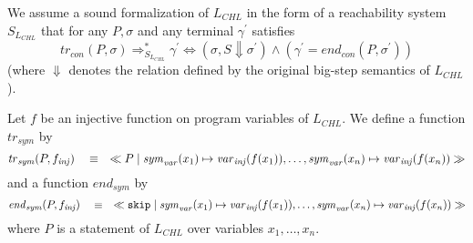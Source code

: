 \begin{assumption}\label{a:sf}
    We assume a sound formalization of $L_{\mathit{CHL}}$ in the form of a reachability system
    $S_{L_{\mathit{CHL}}}$ that for any $P,\sigma$ and any terminal $\gamma^\prime$ satisfies
    \begin{equation*}
        \mathit{tr}_{\mathit{con}}(P, \sigma) \Rightarrow^*_{S_{L_{\mathit{CHL}}}} \gamma^\prime
        \iff
        (\sigma, S \Downarrow \sigma^\prime) \land (\gamma^\prime = \mathit{end}_{\mathit{con}}(P, \sigma^\prime))
    \end{equation*}
    (where $\Downarrow$ denotes the relation defined by the original big-step semantics of $L_{\mathit{CHL}}$).
\end{assumption}

\begin{definition}
    Let $f$ be an injective function on program variables of $L_{\mathit{CHL}}$.
    We define a function $\mathit{tr}_{\mathit{sym}}$ by
    \begin{equation*}
        \mathit{tr}_{\mathit{sym}}(P, f_{\mathit{inj}}) \quad \equiv \quad
        \impConfig{P}{
            \mathit{sym}_\mathit{var}(x_1) \mapsto \mathit{var}_{\mathit{inj}}(f(x_1)),
            \ldots,
            \mathit{sym}_\mathit{var}(x_n) \mapsto \mathit{var}_{\mathit{inj}}(f(x_n))
        }%
    \end{equation*}
    and a function $\mathit{end}_{\mathit{sym}}$ by
    \begin{equation*}
       \mathit{end}_{\mathit{sym}}(P, f_{\mathit{inj}}) \quad \equiv \quad
       \ll\texttt{skip}\mid 
           \mathit{sym}_\mathit{var}(x_1) \mapsto \mathit{var}_{\mathit{inj}}(f(x_1)),
           \ldots,
           \mathit{sym}_\mathit{var}(x_n) \mapsto \mathit{var}_{\mathit{inj}}(f(x_n))
       \gg
    \end{equation*}
    where $P$ is a statement of $L_{\mathit{CHL}}$ over variables $x_1,\ldots,x_n$.
\end{definition}

